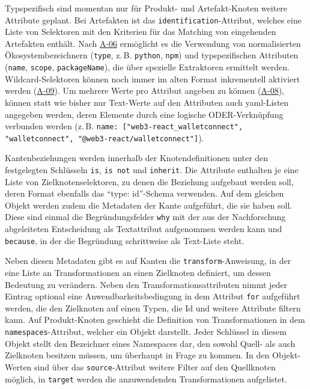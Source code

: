 Typspezifisch sind momentan nur für Produkt- und Artefakt-Knoten weitere Attribute geplant.
Bei Artefakten ist das \texttt{identification}-Attribut, welches eine Liste von Selektoren mit den Kriterien für das Matching von eingehenden Artefakten enthält.
Nach \hyperref[subsec:req-type-specific-matching]{A-06} ermöglicht es die Verwendung von normalisierten Ökosystembezeichnern (\texttt{type}, z.\,B. \texttt{python}, \texttt{npm}) und typspezifischen Attributen (\texttt{name}, \texttt{scope}, \texttt{packageName}), die über spezielle Extraktoren ermittelt werden.
Wildcard-Selektoren können noch immer im alten Format inkrementell aktiviert werden (\hyperref[subsec:req-regex-support]{A-09}).
Um mehrere Werte pro Attribut angeben zu können (\hyperref[subsec:req-multiple-attribute-values]{A-08}), können statt wie bisher nur Text-Werte auf den Attributen auch \acrshort{yaml}-Listen angegeben werden, deren Elemente durch eine logische ODER-Verknüpfung verbunden werden (z.\,B. \texttt{name: ["web3-react\_walletconnect", "walletconnect", "@web3-react/walletconnect"]}).

Kantenbeziehungen werden innerhalb der Knotendefinitionen unter den festgelegten Schlüsseln \texttt{is}, \texttt{is not} und \texttt{inherit}.
Die Attribute enthalten je eine Liste von Zielknotenselektoren, zu denen die Beziehung aufgebaut werden soll, deren Format ebenfalls das \enquote{type: id}-Schema verwenden.
Auf dem gleichen Objekt werden zudem die Metadaten der Kante aufgeführt, die sie haben soll.
Diese sind einmal die Begründungsfelder \texttt{why} mit der aus der Nachforschung abgeleiteten Entscheidung als Textattribut aufgenommen werden kann und \texttt{because}, in der die Begründung schrittweise als Text-Liste steht.

Neben diesen Metadaten gibt es auf Kanten die \texttt{transform}-Anweisung, in der eine Liste an Transformationen an einen Zielknoten definiert, um dessen Bedeutung zu verändern.
Neben den Transformationsattributen nimmt jeder Eintrag optional eine Anwendbarkeitsbedingung in dem Attribut \texttt{for} aufgeführt werden, die den Zielknoten auf einen Typen, die Id und weitere Attribute filtern kann.
Auf Produkt-Knoten geschieht die Definition von Transformationen in dem \texttt{namespaces}-Attribut, welcher ein Objekt darstellt.
Jeder Schlüssel in diesem Objekt stellt den Bezeichner eines Namespaces dar, den sowohl Quell- als auch Zielknoten besitzen müssen, um überhaupt in Frage zu kommen.
In den Objekt-Werten sind über das \texttt{source}-Attribut weitere Filter auf den Quellknoten möglich, in \texttt{target} werden die anzuwendenden Transformationen aufgelistet.

